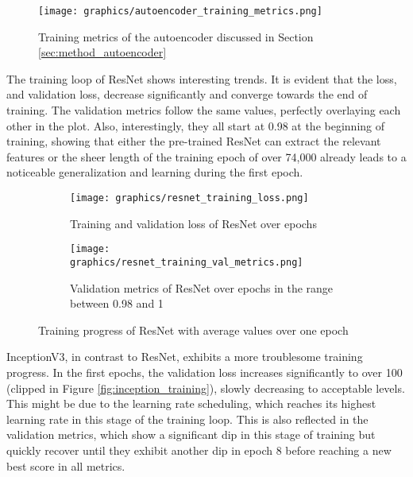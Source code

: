 \documentclass[draft,final]{vutinfth} %
\begin{document}
\begin{appendix}
\begin{figure}
    \centering
    \texttt{[image: graphics/autoencoder\_training\_metrics.png]}
    \caption{Training metrics of the autoencoder discussed in Section \ref{sec:method_autoencoder}}
    \label{fig:autoencoder_train}
\end{figure}

The training loop of ResNet shows interesting trends. It is evident that the loss, and validation loss, decrease significantly and converge towards the end of training. The validation metrics follow the same values, perfectly overlaying each other in the plot. Also, interestingly, they all start at 0.98 at the beginning of training, showing that either the pre-trained ResNet can extract the relevant features or the sheer length of the training epoch of over 74,000 already leads to a noticeable generalization and learning during the first epoch.

\begin{figure}
    \centering
    \begin{subfigure}{0.48\textwidth}
        \texttt{[image: graphics/resnet\_training\_loss.png]}
        \caption{Training and validation loss of ResNet over epochs}
        \label{fig:resnet_training_loss}
    \end{subfigure}
    \begin{subfigure}{0.48\textwidth}
        \centering
        \texttt{[image: graphics/resnet\_training\_val\_metrics.png]}
        \caption{Validation metrics of ResNet over epochs in the range between 0.98 and 1}
        \label{fig:resnet_training_val_metrics}
        
    \end{subfigure}
    \caption{Training progress of ResNet with average values over one epoch}
    \label{fig:resnet_training}
\end{figure}

InceptionV3, in contrast to ResNet, exhibits a more troublesome training progress. In the first epochs, the validation loss increases significantly to over 100 (clipped in Figure \ref{fig:inception_training}), slowly decreasing to acceptable levels. This might be due to the learning rate scheduling, which reaches its highest learning rate in this stage of the training loop. This is also reflected in the validation metrics, which show a significant dip in this stage of training but quickly recover until they exhibit another dip in epoch 8 before reaching a new best score in all metrics.


\end{appendix}
\end{document}
